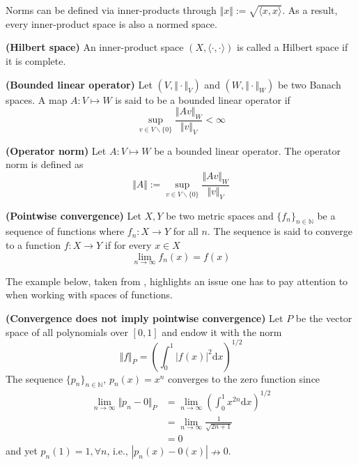Norms can be defined via inner-products through $\Vert x \Vert := \sqrt{\langle x, x\rangle}$. As a result, every inner-product space is also a normed space.

\begin{definition}
	\textbf{(Hilbert space)}
	An inner-product space $(X,\langle \cdot, \cdot \rangle)$ is called a Hilbert space if it is complete.
\end{definition}

\begin{definition}
	\textbf{(Bounded linear operator)}
	Let $(V, \Vert \cdot \Vert_V)$ and $(W, \Vert \cdot \Vert_W)$ be two Banach spaces. A map $A:V \mapsto W$ is said to be a bounded linear operator if
	\begin{equation}
		\sup_{v \in V \backslash \{0\}} \frac{ \Vert Av \Vert_W }{ \Vert v \Vert_V } < \infty
	\end{equation}
\end{definition}

\begin{definition}
	\label{def.operator_norm}
	\textbf{(Operator norm)}
	Let $A:V \mapsto W$ be a bounded linear operator. The operator norm is defined as
	\begin{equation}
		\Vert A \Vert := \sup_{v \in V \backslash \{0\}} \frac{ \Vert Av \Vert_W }{ \Vert v \Vert_V } 
	\end{equation}
\end{definition}

\begin{definition}
	\textbf{(Pointwise convergence)}
	Let $X, Y$ be two metric spaces and $\{f_n\}_{n\in\mathbb{N}}$ be a sequence of functions where $f_n : X \rightarrow Y$ for all $n$. The sequence is said to converge to a function $f: X \rightarrow Y$ if for every $x \in X$
	\begin{equation}
		\lim_{n \rightarrow \infty} f_n(x) = f(x)
	\end{equation}
\end{definition}

The example below, taken from \cite[§1]{berlinet2011reproducing}, highlights an issue one has to pay attention to when working with spaces of functions.

\begin{example}
	\label{ex.appendix_convergence}
	\textbf{(Convergence does not imply pointwise convergence)}
	Let $P$ be the vector space of all polynomials over $[0,1]$ and endow it with the norm
	\begin{equation}
		\Vert f \Vert_{P} = \left( \int_{0}^{1} |f(x)|^2 \text{d}x \right)^{1/2}
	\end{equation}
	The sequence $\{p_n\}_{n\in\mathbb{N}}, \, p_n(x) = x^n$ converges to the zero function since
	\begin{align}
		\lim_{n \rightarrow \infty} \Vert p_n - 0\Vert_{P} &= \lim_{n \rightarrow \infty} \left( \int_{0}^{1} x^{2n} \text{d}x \right)^{1/2} \\
		&= \lim_{n \rightarrow \infty} \frac{1}{\sqrt{2n+1}} \\
		&= 0
	\end{align}
	and yet $p_n(1) = 1, \forall n$, i.e., $|p_n(x) - 0(x)| \nrightarrow 0$.
\end{example}

